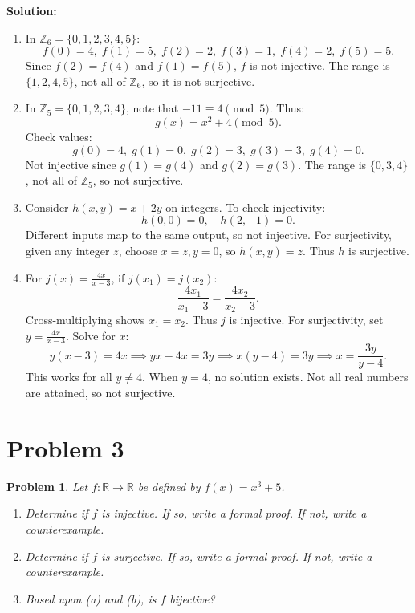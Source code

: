 \documentclass[12pt]{article}
\newtheorem{problem}{Problem}
\theoremstyle{definition}
\begin{document}
\textbf{Solution:}

\begin{enumerate}[label=(\alph*)]
    \item In $\mathbb{Z}_6 = \{0,1,2,3,4,5\}$:
    \[
    f(0)=4, \; f(1)=5, \; f(2)=2, \; f(3)=1,\; f(4)=2,\; f(5)=5.
    \]
    Since $f(2)=f(4)$ and $f(1)=f(5)$, $f$ is not injective. The range is $\{1,2,4,5\}$, not all of $\mathbb{Z}_6$, so it is not surjective.

    \item In $\mathbb{Z}_5 = \{0,1,2,3,4\}$, note that $-11 \equiv 4 \pmod{5}$. Thus:
    \[
    g(x)=x^2+4 \pmod{5}.
    \]
    Check values:
    \[
    g(0)=4,\; g(1)=0,\; g(2)=3,\; g(3)=3,\; g(4)=0.
    \]
    Not injective since $g(1)=g(4)$ and $g(2)=g(3)$. The range is $\{0,3,4\}$, not all of $\mathbb{Z}_5$, so not surjective.

    \item Consider $h(x,y)=x+2y$ on integers. To check injectivity:
    \[
    h(0,0)=0,\quad h(2,-1)=0.
    \]
    Different inputs map to the same output, so not injective. For surjectivity, given any integer $z$, choose $x=z, y=0$, so $h(x,y)=z$. Thus $h$ is surjective.

    \item For $j(x)=\frac{4x}{x-3}$, if $j(x_1)=j(x_2)$:
    \[
    \frac{4x_1}{x_1-3}=\frac{4x_2}{x_2-3}.
    \]
    Cross-multiplying shows $x_1=x_2$. Thus $j$ is injective. For surjectivity, set $y=\frac{4x}{x-3}$. Solve for $x$:
    \[
    y(x-3)=4x \implies yx -4x =3y \implies x(y-4)=3y \implies x=\frac{3y}{y-4}.
    \]
    This works for all $y \neq 4$. When $y=4$, no solution exists. Not all real numbers are attained, so not surjective.
\end{enumerate}

\newpage

\section*{Problem 3}

\begin{problem}
Let $f : \mathbb{R} \to \mathbb{R}$ be defined by $f(x) = x^3 + 5$.

\begin{enumerate}[label=(\alph*)]
    \item Determine if $f$ is injective. If so, write a formal proof. If not, write a counterexample.
    \item Determine if $f$ is surjective. If so, write a formal proof. If not, write a counterexample.
    \item Based upon (a) and (b), is $f$ bijective?
\end{enumerate}
\end{problem}
\end{document}
